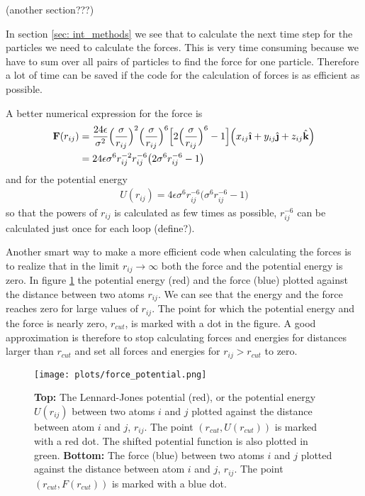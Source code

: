 \documentclass[11pt,a4wide]{article}
\renewcommand{\vec}{\mathbf}
\newcommand{\ihat}{\hat{\textbf{\i}}}
\newcommand{\jhat}{\hat{\textbf{\j}}}
\newcommand{\khat}{\hat{\textbf{k}}}
\begin{document}
(another section???)

In section \ref{sec: int_methods} we see that to calculate the next time step for the particles we need to calculate the forces. This is very time consuming because we have to sum over all pairs of particles to find the force for one particle. Therefore a lot of time can be saved if the code for the calculation of forces is as efficient as possible.

A better numerical expression for the force is
\begin{align*}
\vec F(r_{ij}) &= \frac{24\epsilon}{\sigma^2} \Big(\frac{\sigma}{r_{ij}}\Big)^2\Big(\frac{\sigma}{r_{ij}}\Big)^6\Big[2\Big(\frac{\sigma}{r_{ij}}\Big)^{6} - 1 \Big]\Big(x_{ij}\ihat + y_{ij}\jhat + z_{ij}\khat \Big)\\
&= 24\epsilon\sigma^6r_{ij}^{-2}r_{ij}^{-6}\big(2\sigma^6r_{ij}^{-6} - 1\big)
\end{align*}
and for the potential energy
\begin{align*}
U(r_{ij}) = 4\epsilon\sigma^6r_{ij}^{-6}\big(\sigma^6r_{ij}^{-6} - 1\big)
\end{align*}
so that the powers of $r_{ij}$ is calculated as few times as possible, $r_{ij}^{-6}$ can be calculated just once for each loop (define?).  

Another smart way to make a more efficient code when calculating the forces is to realize that in the limit $r_{ij}\rightarrow \infty$ both the force and the potential energy is zero. In figure \ref{fig: force_potential} the potential energy (red) and the force (blue) plotted against the distance between two atoms $r_{ij}$. We can see that the energy and the force reaches zero for large values of $r_{ij}$.  The point for which the potential energy and the force is nearly zero, $r_{cut}$, is marked with a dot in the figure. A good approximation is therefore to stop calculating forces and energies for distances larger than $r_{cut}$ and set all forces and energies for $r_{ij} > r_{cut}$ to zero.

\begin{figure}
\centering
\texttt{[image: plots/force\_potential.png]}
\caption{\textbf{Top:} The Lennard-Jones potential (red), or the potential energy $U(r_{ij})$ between two atoms $i$ and $j$ plotted against the distance between atom $i$ and $j$, $r_{ij}$. The point $(r_{cut},U(r_{cut}))$ is marked with a  red dot. The shifted potential function is also plotted in green. \textbf{Bottom:}  The force (blue) between two atoms $i$ and $j$ plotted against the distance between atom $i$ and $j$, $r_{ij}$. The point $(r_{cut}, F(r_{cut}))$ is marked with a blue dot.}
\label{fig: force_potential}
\end{figure}
\end{document}

